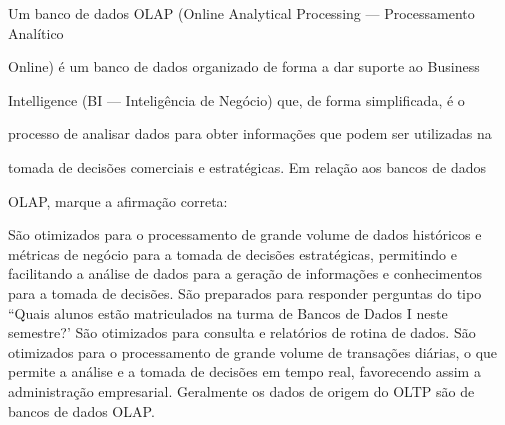 \documentclass[12pt, addpoints]{exam}
\begin{document}
    \begin{questions}

    \newpage
    \question

Um banco de dados OLAP (Online Analytical Processing --- Processamento Analítico

Online) é um banco de dados organizado de forma a dar suporte ao Business

Intelligence (BI --- Inteligência de Negócio) que, de forma simplificada, é o

processo de analisar dados para obter informações que podem ser utilizadas na

tomada de decisões comerciais e estratégicas. Em relação aos bancos de dados

OLAP, marque a afirmação correta:
\begin{choices}
\choice São otimizados para o processamento de grande volume de dados históricos e métricas de negócio para a tomada de decisões estratégicas, permitindo e facilitando a análise de dados para a geração de informações e conhecimentos para a tomada de decisões.
\choice São preparados para responder perguntas do tipo ``Quais alunos estão matriculados na turma de Bancos de Dados I neste semestre?'
\choice São otimizados para consulta e relatórios de rotina de dados.
\choice São otimizados para o processamento de grande volume de transações diárias, o que permite a análise e a tomada de decisões em tempo real, favorecendo assim a administração empresarial.
\choice Geralmente os dados de origem do OLTP são de bancos de dados OLAP.
\end{choices}



    \end{questions}
    
\end{document}
